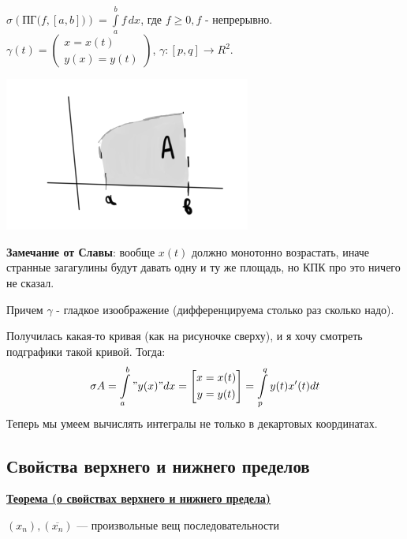 \documentclass{article}
\newcommand{\integral}[2]{\displaystyle\int\limits_{#1}^{#2}}
\newcommand{\thmm}[1]{\underline{\textbf{#1}}}
\begin{document}
$\sigma (\text{ПГ($f, [a,b]$)}) = \integral{a}{b}f\, dx$, где $f \geq 0, f$ - непрерывно.
$\gamma(t) =  \left (\begin{gathered}
    x = x(t)\\
    y(x) = y(t)
\end{gathered}\right)$, $\gamma:[p,q] \rightarrow R^2$.
\begin{center}
   \includegraphics[width = 7 cm]{assets/integral_4.png}
\end{center}
\textbf{Замечание от Славы}: вообще $x(t)$ должно монотонно возрастать, иначе странные загагулины будут давать одну и ту же площадь, но КПК про это ничего не сказал.

Причем $\gamma$ -  гладкое изоображение (дифференцируема столько раз сколько надо).

Получилась какая-то кривая (как на рисуночке сверху), и я хочу смотреть подграфики такой кривой. Тогда:
$$\sigma A = \integral{a}{b}"y(x)"dx = \left[\begin{gathered}
    x = x(t)\\
    y = y(t)
\end{gathered}\right] = \integral{p}{q}y(t) x'(t) dt$$
Теперь мы умеем вычислять интегралы не только в декартовых координатах.


\subsection{Свойства верхнего и нижнего пределов}

\thmm{Теорема (о свойствах верхнего и нижнего предела)}

$(x_n), (\overline{x_n})$ --- произвольные вещ последовательности
\end{document}
